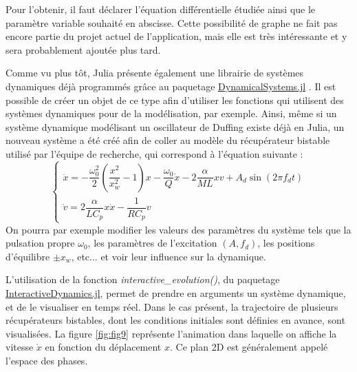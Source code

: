 \documentclass[a4paper, french, 12pt, titlepage]{article}
\begin{document}
Pour l'obtenir, il faut déclarer l'équation différentielle étudiée ainsi que le paramètre variable souhaité en abscisse.
Cette possibilité de graphe ne fait pas encore partie du projet actuel de l'application, mais elle est très intéressante et y sera probablement ajoutée plus tard.

Comme vu plus tôt, Julia présente également une librairie de systèmes dynamiques déjà programmés grâce au paquetage \href{https://juliadynamics.github.io/DynamicalSystems.jl/latest/}{DynamicalSystems.jl} \cite{Datseris2018}.
Il est possible de créer un objet de ce type afin d'utiliser les fonctions qui utilisent des systèmes dynamiques pour de la modélisation, par exemple.
Ainsi, même si un système dynamique modélisant un oscillateur de Duffing existe déjà en Julia, un nouveau système a été créé afin de coller au modèle du récupérateur bistable utilisé par l'équipe de recherche, qui correspond à l'équation suivante : 
\begin{equation}
  \left\{
  \begin{array}{ll}
    \ddot{x} = -\dfrac{\omega_0^2}{2} \left( \dfrac{x^2}{x_w^2} - 1 \right) x - \dfrac{\omega_0}{Q} \dot{x} - 2 \dfrac{\alpha}{M L} x v + A_d \sin(2 \pi f_d t) \\[5mm]
    \dot{v} =   2 \dfrac{\alpha}{LC_p} x \dot{x} - \dfrac{1}{R C_p} v
  \end{array}
  \right.
\end{equation}
On pourra par exemple modifier les valeurs des paramètres du système tels que la pulsation propre $\omega_0$, les paramètres de l'excitation $(A, f_d)$, les positions d'équilibre $\pm x_w$, etc... et voir leur influence sur la dynamique.


L'utilisation de la fonction \emph{interactive\_evolution()}, du paquetage \href{https://juliadynamics.github.io/InteractiveDynamics.jl/dev/}{InteractiveDynamics.jl}, permet de prendre en arguments un système dynamique, et de le visualiser en temps réel.
Dans le cas présent, la trajectoire de plusieurs récupérateurs bistables, dont les conditions initiales sont définies en avance, sont visualisées.
La figure \ref{fig:fig9} représente l'animation dans laquelle on affiche la vitesse $\dot{x}$ en fonction du déplacement $x$.
Ce plan 2D est généralement appelé l'espace des phases.
\end{document}
